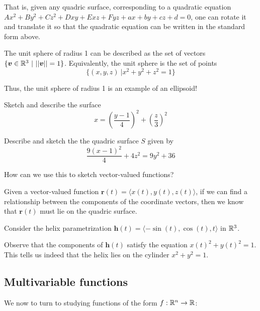 That is, given any quadric surface, corresponding to a quadratic equation $Ax^2 + By^2 + Cz^2 + Dxy + Exz + Fyz + ax + by + cz + d = 0$, one can rotate it and translate it so that the quadratic equation can be written in the standard form above.



\begin{example}
The unit sphere of radius 1 can be described as the set of vectors $\{\bm{v} \in \mathbb{R}^3 \ | \ ||\bm{v}|| = 1\}$.  Equivalently, the unit sphere is the set of points $$\{ (x, y, z) \ | x^2 + y^2 + z^2 =1\}$$

Thus, the unit sphere of radius 1 is an example of an ellipsoid!
\end{example}

\begin{example}
Sketch and describe the surface $$x = \left(\frac{y-1}{4}\right)^2 + \left(\frac{z}{3}\right)^2 $$
\end{example}

\begin{example}
Describe and sketch the the quadric surface $S$ given by $$\frac{9(x-1)^2}{4}+4z^2 =9y^2 + 36$$
\end{example}


\begin{motivating}
How can we use this to sketch vector-valued functions?
\end{motivating}


Given a vector-valued function $\bm{r}(t) = \langle x(t), y(t), z(t) \rangle$, if we can find a relationship between the components of the coordinate vectors, then we know that $\bm{r}(t)$ must lie on the quadric surface.

\begin{example}
Consider the helix parametrization $\bm{h}(t) = \langle -\sin(t), \cos(t), t \rangle$ in $\mathbb{R}^3$.

Observe that the components of $\bm{h}(t)$ satisfy the equation $x(t)^2 + y(t)^2 = 1$.  This tells us indeed that the helix lies on the cylinder $x^2 + y^2 = 1$.

\end{example}



\subsection{Multivariable functions}\label{multivariablefunctions}

We now to turn to studying functions of the form $f : \mathbb{R}^n \to \mathbb{R}$:

